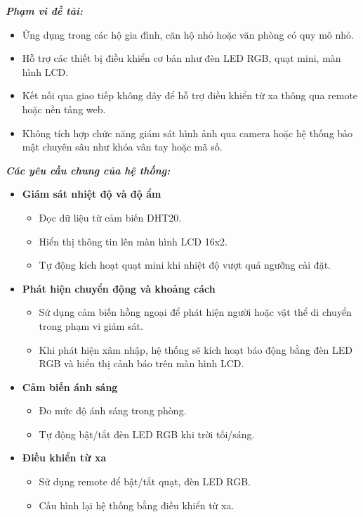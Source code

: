 \textbf{\textit{Phạm vi đề tài:}}
\begin{itemize}
    \item Ứng dụng trong các hộ gia đình, căn hộ nhỏ hoặc văn phòng có quy mô nhỏ.
    \item Hỗ trợ các thiết bị điều khiển cơ bản như đèn LED RGB, quạt mini, màn hình LCD.
    \item Kết nối qua giao tiếp không dây để hỗ trợ điều khiển từ xa thông qua remote hoặc nền tảng web.
    \item Không tích hợp chức năng giám sát hình ảnh qua camera hoặc hệ thống bảo mật chuyên sâu như khóa vân tay hoặc mã số.
\end{itemize}


\textbf{\textit{Các yêu cầu chung của hệ thống:}}
\begin{itemize}
    \item \textbf{Giám sát nhiệt độ và độ ẩm}
          \begin{itemize}
              \item Đọc dữ liệu từ cảm biến DHT20.
              \item Hiển thị thông tin lên màn hình LCD 16x2.
              \item Tự động kích hoạt quạt mini khi nhiệt độ vượt quá ngưỡng cài đặt.
          \end{itemize}
    \item \textbf{Phát hiện chuyển động và khoảng cách}
          \begin{itemize}
              \item Sử dụng cảm biến hồng ngoại để phát hiện người hoặc vật thể di chuyển trong phạm vi giám sát.
              \item Khi phát hiện xâm nhập, hệ thống sẽ kích hoạt báo động bằng đèn LED RGB và hiển thị cảnh báo trên màn hình LCD.
          \end{itemize}
    \item \textbf{Cảm biến ánh sáng}
          \begin{itemize}
              \item Đo mức độ ánh sáng trong phòng.
              \item Tự động bật/tắt đèn LED RGB khi trời tối/sáng.
          \end{itemize}
    \item \textbf{Điều khiển từ xa}
          \begin{itemize}
              \item Sử dụng remote để bật/tắt quạt, đèn LED RGB.
              \item Cấu hình lại hệ thống bằng điều khiển từ xa.

\end{itemize}
\end{itemize}
